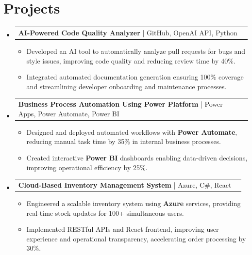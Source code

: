 \documentclass[letterpaper,11pt]{article}
\makeatletter
\newcommand{\resumeItem}[1]{
  \item\footnotesize{
    {#1 \vspace{-2pt}}
  }
}
\newcommand{\resumeProjectHeading}[2]{
    \item
    \begin{tabular*}{1.001\textwidth}{l@{\extracolsep{\fill}}r}
      \small#1 & \textbf{\small #2}\\
    \end{tabular*}\vspace{-7pt}
}
\newcommand{\resumeSubHeadingListStart}{\begin{itemize}[leftmargin=0pt, label={}]}
\newcommand{\resumeSubHeadingListEnd}{\end{itemize}}
\newcommand{\resumeItemListStart}{\begin{itemize}[leftmargin=*]}
\newcommand{\resumeItemListEnd}{\end{itemize}\vspace{-5pt}}
\makeatother
\begin{document}
\section{Projects}
    \vspace{-5pt}
    \resumeSubHeadingListStart
          \resumeProjectHeading
              {\textbf{AI-Powered Code Quality Analyzer} | GitHub, OpenAI API, Python}{}
        \resumeItemListStart
            \resumeItem{Developed an AI tool to automatically analyze pull requests for bugs and style issues, improving code quality and reducing review time by 40\%.}
            \resumeItem{Integrated automated documentation generation ensuring 100\% coverage and streamlining developer onboarding and maintenance processes.}
        \resumeItemListEnd
        \vspace{-12pt}
    
    \resumeProjectHeading
        {\textbf{Business Process Automation Using Power Platform} | Power Apps, Power Automate, Power BI}{}
        \resumeItemListStart
            \resumeItem{Designed and deployed automated workflows with \textbf{Power Automate}, reducing manual task time by 35\% in internal business processes.}
            \resumeItem{Created interactive \textbf{Power BI} dashboards enabling data-driven decisions, improving operational efficiency by 25\%.}
        \resumeItemListEnd
          \vspace{-12pt}
      \resumeProjectHeading
          {\textbf{Cloud-Based Inventory Management System} | Azure, C\#, React}{}
          \resumeItemListStart
              \resumeItem{Engineered a scalable inventory system using \textbf{Azure} services, providing real-time stock updates for 100+ simultaneous users.}
              \resumeItem{Implemented RESTful APIs and React frontend, improving user experience and operational transparency, accelerating order processing by 30\%.}
          \resumeItemListEnd 
    \resumeSubHeadingListEnd
\end{document}
